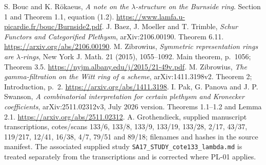  S. Bouc and K. R\"okaeus, \emph{A note on the $\lambda$-structure on the Burnside ring}. Section 1 and Theorem 1.1, equation (1.2). \url{https://www.lamfa.u-picardie.fr/bouc/Burnside2.pdf}.
 J. Baez, J. Moeller and T. Trimble, \emph{Schur Functors and Categorified Plethysm}, arXiv:2106.00190. Theorem 6.11. \url{https://arxiv.org/abs/2106.00190}.
 M. Zibrowius, \emph{Symmetric representation rings are $\lambda$-rings}, New York J. Math. 21 (2015), 1055--1092. Main theorem, p.~1056; Theorem 3.5. \url{https://nyjm.albany.edu/j/2015/21-49v.pdf}.
 M. Zibrowius, \emph{The gamma-filtration on the Witt ring of a scheme}, arXiv:1411.3198v2. Theorem 2; Introduction, p.~2. \url{https://arxiv.org/abs/1411.3198}.
 I. Pak, G. Panova and J. P. Swanson, \emph{A combinatorial interpretation for certain plethysm and Kronecker coefficients}, arXiv:2511.02312v3, July 2026 version. Theorems 1.1--1.2 and Lemma 2.1. \url{https://arxiv.org/abs/2511.02312}.
 A. Grothendieck, supplied manuscript transcriptions, cotes/scans 133/6, 133/8, 133/9, 133/19, 133/28, 2/17, 43/37, 119/217, 12/41, 16/38, 4/7, 79/51 and 89/18; filenames and hashes in the source manifest. The associated supplied study \texttt{SA17\_STUDY\_cote133\_lambda.md} is treated separately from the transcriptions and is corrected where PL-01 applies.
